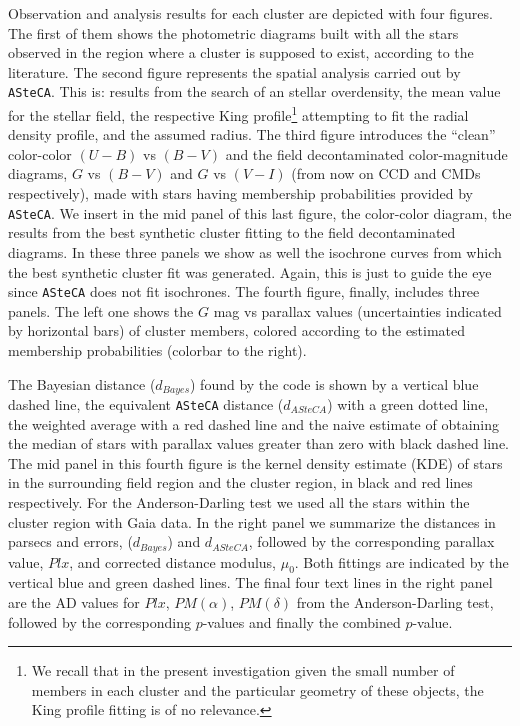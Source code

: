 \documentclass[draft]{aa}
\begin{document}
Observation and analysis results for each cluster are depicted with four
figures. The first of them shows the photometric diagrams built with
all the stars observed in the region where a cluster is supposed to exist,
according to the literature.
The second figure represents the spatial analysis carried out by
\texttt{ASteCA}. This is: results from the search of an stellar overdensity, the
mean value for the stellar field, the respective King profile\footnote{We
recall that in the present investigation given the small number of members in
each cluster and the particular geometry of these objects, the King profile
fitting is of no relevance.} attempting to fit the radial density profile, and
the assumed radius.
The third figure introduces the ``clean'' color-color $(U-B)$ vs $(B-V)$ and
the field decontaminated color-magnitude diagrams, $G$ vs $(B-V)$ and $G$ vs $
(V-I)$ (from now on CCD and CMDs respectively), made with stars having
membership probabilities provided by \texttt{ASteCA}. We insert in the
mid panel of this last figure, the color-color diagram, the results from the
best synthetic cluster fitting to the field decontaminated diagrams. In these
three panels we show as well the isochrone curves from which the best
synthetic cluster fit was generated. Again, this is just to guide the eye since
\texttt{ASteCA} does not fit isochrones.
%
The fourth figure, finally, includes three panels. The left one shows the
$G$ mag vs parallax values (uncertainties indicated by horizontal bars) of
cluster members, colored according to the estimated membership probabilities 
(colorbar to the right). 

%
The Bayesian distance ($d_{Bayes}$) found by the code is shown by a vertical
blue dashed line, the equivalent \texttt{ASteCA} distance ($d_{ASteCA}$) with a
green dotted line, the weighted average with a red dashed line and the naive
estimate of obtaining the median of stars with parallax values greater than
zero with black dashed line.
%
The mid panel in this fourth figure is the kernel density estimate (KDE) of
stars in the surrounding field region and the cluster region, in black and red
lines respectively. For the Anderson-Darling test we used all the
stars within the cluster region with Gaia data. In the right panel we
summarize the distances in parsecs and errors, ($d_{Bayes}$)
and $d_{ASteCA}$, followed by the corresponding parallax
value, $Plx$, and corrected distance modulus, $\mu_0$. Both
fittings are indicated by the vertical blue and green dashed lines. The final
four text lines in the right panel are the AD values for $Plx$, $PM(\alpha)$,
$PM(\delta)$ from the Anderson-Darling test, followed by the corresponding
$p$-values and finally the combined $p$-value.\\
\end{document}
